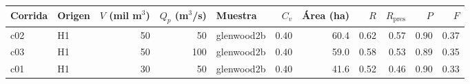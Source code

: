 \begin{tabular}{llrrlrrrrrr}\toprule
Corrida & Origen & $V$ (mil m$^3$) & $Q_p$ (m$^3$/s) & Muestra & $C_v$ & Área (ha) & $R$ & $R_\mathrm{pres}$ & $P$ & $F$\\\midrule
c02 & H1 & 50 & 50 & glenwood2b & 0.40 & 60.4 & 0.62 & 0.57 & 0.90 & 0.37\\
c03 & H1 & 50 & 100 & glenwood2b & 0.40 & 59.0 & 0.58 & 0.53 & 0.89 & 0.35\\
c01 & H1 & 30 & 50 & glenwood2b & 0.40 & 41.6 & 0.52 & 0.46 & 0.90 & 0.33\\
\bottomrule\end{tabular}
